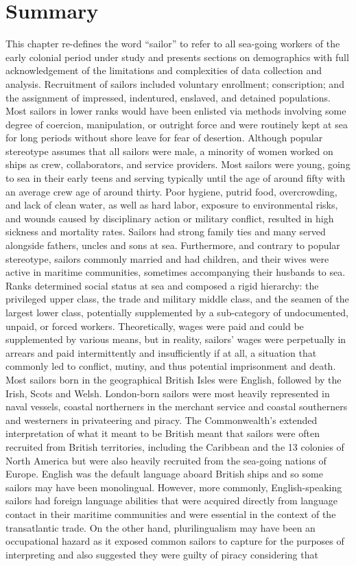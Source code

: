 \section{\textbf{Summary}}%

  This chapter re-defines the word “sailor” to refer to all sea-going workers of the early colonial period under study and presents sections on demographics with full acknowledgement of the limitations and complexities of data collection and analysis. Recruitment of sailors included voluntary enrollment; conscription; and the assignment of impressed, indentured, enslaved, and detained populations. Most sailors in lower ranks would have been enlisted via methods involving some degree of coercion, manipulation, or outright force and were routinely kept at sea for long periods without shore leave for fear of desertion. Although popular stereotype assumes that all sailors were male, a minority of women worked on ships as crew, collaborators, and service providers. Most sailors were young, going to sea in their early teens and serving typically until the age of around fifty with an average crew age of around thirty. Poor hygiene, putrid food, overcrowding, and lack of clean water, as well as hard labor, exposure to environmental risks, and wounds caused by disciplinary action or military conflict, resulted in high sickness and mortality rates. Sailors had strong family ties and many served alongside fathers, uncles and sons at sea. Furthermore, and contrary to popular stereotype, sailors commonly married and had children, and their wives were active in maritime communities, sometimes accompanying their husbands to sea. Ranks determined social status at sea and composed a rigid hierarchy: the privileged upper class, the trade and military middle class, and the seamen of the largest lower class, potentially supplemented by a sub-category of undocumented, unpaid, or forced workers. Theoretically, wages were paid and could be supplemented by various means, but in reality, sailors’ wages were perpetually in arrears and paid intermittently and insufficiently if at all, a situation that commonly led to conflict, mutiny, and thus potential imprisonment and death. Most sailors born in the geographical British Isles were English, followed by the Irish, Scots and Welsh.  London{}-born sailors were most heavily represented in naval vessels, coastal northerners in the merchant service and coastal southerners and westerners in privateering and piracy. The Commonwealth’s extended interpretation of what it meant to be British meant that sailors were often recruited from British territories, including the Caribbean and the 13 colonies of North America but were also heavily recruited from the sea-going nations of Europe. English was the default language aboard British ships and so some sailors may have been monolingual. However, more commonly, English-speaking sailors had foreign language abilities that were acquired directly from language contact in their maritime communities and were essential in the context of the transatlantic trade. On the other hand, plurilingualism may have been an occupational hazard as it exposed common sailors to capture for the purposes of interpreting and also suggested they were guilty of piracy considering that 